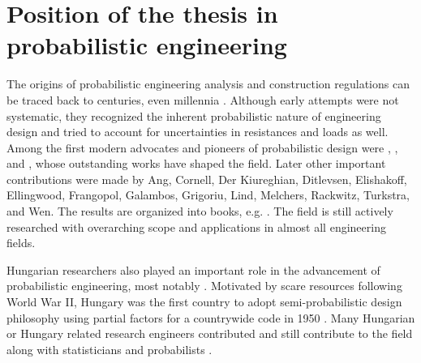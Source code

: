\section{Position of the thesis in probabilistic engineering} 

The origins of probabilistic engineering analysis and construction regulations can be traced back to centuries, even millennia \citep{Nowak2000}. Although early attempts were not systematic, they recognized the inherent probabilistic nature of engineering design and tried to account for uncertainties in resistances and loads as well. Among the first modern advocates and pioneers of probabilistic design were \citet{Kazinczy1921}, \citet{Mayer1926}, and \citet{Freudenthal1947}, whose outstanding works have shaped the field.
Later other important contributions were made by Ang, Cornell, Der Kiureghian, Ditlevsen,  Elishakoff, Ellingwood, Frangopol, Galambos, Grigoriu, Lind, Melchers, Rackwitz, Turkstra, and Wen.
The results are organized into books, e.g. \citet{Melchers2002,Ditlevsen2007,Nowak2000,Elishakoff2004,Ang2006,Cornell1967,Cristensen1982}.
The field is still  actively researched with overarching scope and applications in almost all engineering fields.

Hungarian researchers also played an important role in the advancement of probabilistic engineering, most notably \citet{Kazinczy1921}. Motivated by scare resources following World War II, Hungary was the first country to adopt semi-probabilistic design philosophy using partial factors for a countrywide code in 1950 \citep{Menyhard1951}. Many Hungarian or Hungary related research engineers contributed and still contribute to the field \citep{Misteth2001, Koris2009, Szalai2011, Logo2011, Rad2011, Honfi2013} along with statisticians and probabilists \citep{Renyi1970, Prekopa1995, Habib2000, Szantai2012, Galambos1978}.


